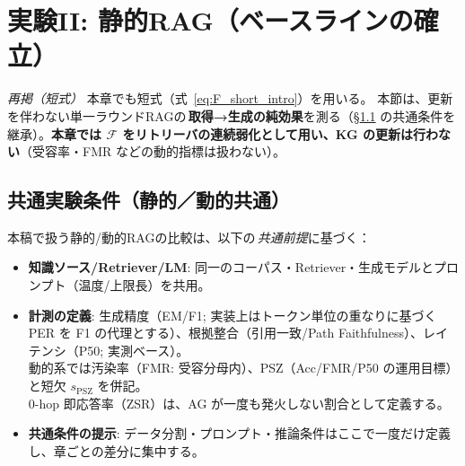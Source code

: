 \documentclass[ja=standard,xelatex]{bxjsarticle}
\newcommand{\F}{\mathcal{F}}
\begin{document}
\section{実験II: 静的RAG（ベースラインの確立）}
\noindent\textit{再掲（短式）}\; 本章でも短式（式~\ref{eq:F_short_intro}）を用いる。
\label{sec:rag_experiment}
本節は、更新を伴わない単一ラウンドRAGの\,\textbf{取得→生成の純効果}を測る（\S\ref{sec:common_setup} の共通条件を継承）。\;\textbf{本章では $\F$ をリトリーバの連続弱化として用い、KG の更新は行わない}（受容率・FMR などの動的指標は扱わない）。

\subsection{共通実験条件（静的／動的共通）}\label{sec:common_setup}
本稿で扱う静的/動的RAGの比較は、以下の\,\emph{共通前提}に基づく：
\begin{itemize}[leftmargin=1.6em]
  \item \textbf{知識ソース/Retriever/LM}: 同一のコーパス・Retriever・生成モデルとプロンプト（温度/上限長）を共用。
  \item \textbf{計測の定義}: 生成精度（EM/F1; 実装上はトークン単位の重なりに基づく PER を F1 の代理とする）、根拠整合（引用一致/Path Faithfulness）、レイテンシ（P50; 実測ベース）。\\
        動的系では汚染率（FMR: 受容分母内）、PSZ（Acc/FMR/P50 の運用目標）と短欠 $s_{\mathrm{PSZ}}$ を併記。\\
        0-hop 即応答率（ZSR）は、AG が一度も発火しない割合として定義する。
  \item \textbf{共通条件の提示}: データ分割・プロンプト・推論条件はここで一度だけ定義し、章ごとの差分に集中する。
\end{itemize}

\end{document}
